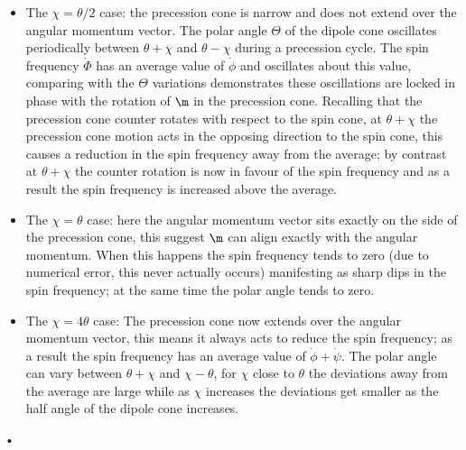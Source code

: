 \documentclass[/home/greg/Thesis/main/main.tex]{subfiles}
\begin{document}
\begin{itemize}
\item The $\chi = \theta/2$ case: the precession cone is narrow and does not
extend over the angular momentum vector. The polar angle $\Theta$ of the dipole
cone oscillates periodically between $\theta+\chi$ and $\theta-\chi$
during a precession cycle. The spin frequency $\dot{\Phi}$ has an average value
of $\dot{\phi}$ and
oscillates about this value, comparing with the $\Theta$ variations
demonstrates these oscillations are locked in phase with the rotation of $\m$
in the precession cone. Recalling that the precession cone counter rotates with
respect to the spin cone, at $\theta+\chi$ the precession cone motion acts in
the opposing direction to the spin cone, this causes a reduction in the spin
frequency away from the average; by contrast at $\theta+\chi$ the counter
rotation is now in favour of the spin frequency and as a result the spin
frequency is increased above the average.

\item The $\chi = \theta$ case: here the angular momentum vector sits exactly
on the side of the precession cone, this suggest $\m$ can align exactly with
the angular momentum. When this happens the spin frequency tends to zero (due
to numerical error, this never actually occurs) manifesting as sharp dips in the
spin frequency; at the same time the polar angle tends to zero.

\item The $\chi = 4\theta$ case: The precession cone now extends over the
angular momentum vector, this means it always acts to reduce the spin
frequency; as a result the spin frequency has an average value of
$\dot{\phi} + \dot{\psi}$. The polar angle can vary between $\theta+\chi$ and
$\chi-\theta$, for $\chi$ close to $\theta$ the deviations away from the
average are large while as $\chi$ increases the deviations get smaller as
the half angle of the dipole cone increases.
\end{itemize}•

\begin{figure}[ht]
\centering
	\\
\caption{}
\label{fig: variations}
\end{figure}
\end{document}
